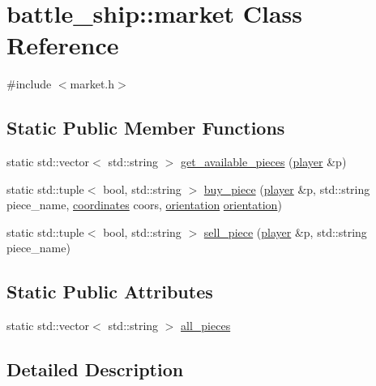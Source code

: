 \hypertarget{classbattle__ship_1_1market}{}\section{battle\+\_\+ship\+:\+:market Class Reference}
\label{classbattle__ship_1_1market}


{\ttfamily \#include $<$market.\+h$>$}

\subsection*{Static Public Member Functions}
\begin{DoxyCompactItemize}
\item 
static std\+::vector$<$ std\+::string $>$ \hyperlink{classbattle__ship_1_1market_a0da0b4d6279e2b07a900eaf76d23c691}{get\+\_\+available\+\_\+pieces} (\hyperlink{classbattle__ship_1_1player}{player} \&p)
\item 
static std\+::tuple$<$ bool, std\+::string $>$ \hyperlink{classbattle__ship_1_1market_ab8bfb830477cdb9fc361a13306c14859}{buy\+\_\+piece} (\hyperlink{classbattle__ship_1_1player}{player} \&p, std\+::string piece\+\_\+name, \hyperlink{structbattle__ship_1_1coordinates}{coordinates} coors, \hyperlink{namespacebattle__ship_aed87488f0a73f0d0679fe343fb61c784}{orientation} \hyperlink{namespacebattle__ship_aed87488f0a73f0d0679fe343fb61c784}{orientation})
\item 
static std\+::tuple$<$ bool, std\+::string $>$ \hyperlink{classbattle__ship_1_1market_a9f0233812e846d7c2f111c2d1721a2a1}{sell\+\_\+piece} (\hyperlink{classbattle__ship_1_1player}{player} \&p, std\+::string piece\+\_\+name)
\end{DoxyCompactItemize}
\subsection*{Static Public Attributes}
\begin{DoxyCompactItemize}
\item 
static std\+::vector$<$ std\+::string $>$ \hyperlink{classbattle__ship_1_1market_a1bc7fb6748d38524516703c171a7041d}{all\+\_\+pieces}
\end{DoxyCompactItemize}


\subsection{Detailed Description}


